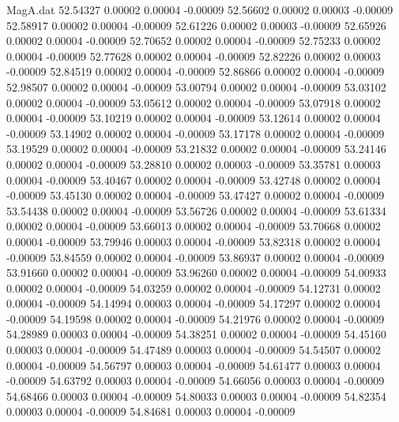 \begin{filecontents}{MagA.dat}
  52.54327    0.00002    0.00004   -0.00009
  52.56602    0.00002    0.00003   -0.00009
  52.58917    0.00002    0.00004   -0.00009
  52.61226    0.00002    0.00003   -0.00009
  52.65926    0.00002    0.00004   -0.00009
  52.70652    0.00002    0.00004   -0.00009
  52.75233    0.00002    0.00004   -0.00009
  52.77628    0.00002    0.00004   -0.00009
  52.82226    0.00002    0.00003   -0.00009
  52.84519    0.00002    0.00004   -0.00009
  52.86866    0.00002    0.00004   -0.00009
  52.98507    0.00002    0.00004   -0.00009
  53.00794    0.00002    0.00004   -0.00009
  53.03102    0.00002    0.00004   -0.00009
  53.05612    0.00002    0.00004   -0.00009
  53.07918    0.00002    0.00004   -0.00009
  53.10219    0.00002    0.00004   -0.00009
  53.12614    0.00002    0.00004   -0.00009
  53.14902    0.00002    0.00004   -0.00009
  53.17178    0.00002    0.00004   -0.00009
  53.19529    0.00002    0.00004   -0.00009
  53.21832    0.00002    0.00004   -0.00009
  53.24146    0.00002    0.00004   -0.00009
  53.28810    0.00002    0.00003   -0.00009
  53.35781    0.00003    0.00004   -0.00009
  53.40467    0.00002    0.00004   -0.00009
  53.42748    0.00002    0.00004   -0.00009
  53.45130    0.00002    0.00004   -0.00009
  53.47427    0.00002    0.00004   -0.00009
  53.54438    0.00002    0.00004   -0.00009
  53.56726    0.00002    0.00004   -0.00009
  53.61334    0.00002    0.00004   -0.00009
  53.66013    0.00002    0.00004   -0.00009
  53.70668    0.00002    0.00004   -0.00009
  53.79946    0.00003    0.00004   -0.00009
  53.82318    0.00002    0.00004   -0.00009
  53.84559    0.00002    0.00004   -0.00009
  53.86937    0.00002    0.00004   -0.00009
  53.91660    0.00002    0.00004   -0.00009
  53.96260    0.00002    0.00004   -0.00009
  54.00933    0.00002    0.00004   -0.00009
  54.03259    0.00002    0.00004   -0.00009
  54.12731    0.00002    0.00004   -0.00009
  54.14994    0.00003    0.00004   -0.00009
  54.17297    0.00002    0.00004   -0.00009
  54.19598    0.00002    0.00004   -0.00009
  54.21976    0.00002    0.00004   -0.00009
  54.28989    0.00003    0.00004   -0.00009
  54.38251    0.00002    0.00004   -0.00009
  54.45160    0.00003    0.00004   -0.00009
  54.47489    0.00003    0.00004   -0.00009
  54.54507    0.00002    0.00004   -0.00009
  54.56797    0.00003    0.00004   -0.00009
  54.61477    0.00003    0.00004   -0.00009
  54.63792    0.00003    0.00004   -0.00009
  54.66056    0.00003    0.00004   -0.00009
  54.68466    0.00003    0.00004   -0.00009
  54.80033    0.00003    0.00004   -0.00009
  54.82354    0.00003    0.00004   -0.00009
  54.84681    0.00003    0.00004   -0.00009

\end{filecontents}
